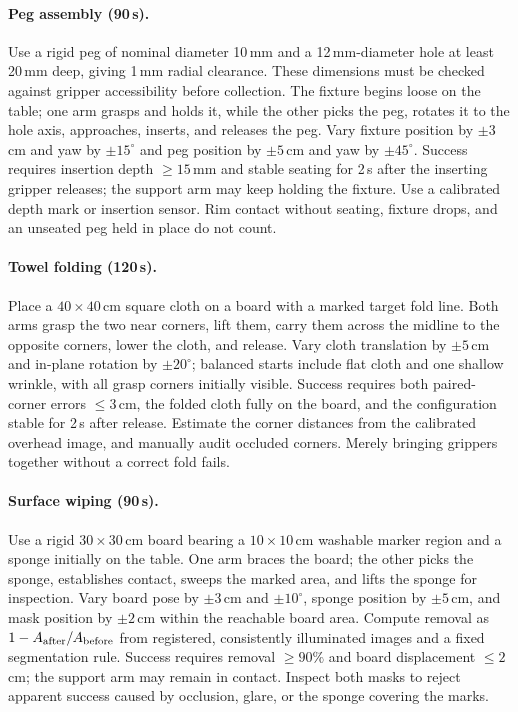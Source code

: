 \paragraph{Peg assembly (90\,s).}
Use a rigid peg of nominal diameter 10\,mm and a 12\,mm-diameter hole at least 20\,mm deep, giving 1\,mm radial clearance. These dimensions must be checked against gripper accessibility before collection. The fixture begins loose on the table; one arm grasps and holds it, while the other picks the peg, rotates it to the hole axis, approaches, inserts, and releases the peg. Vary fixture position by $\pm3$\,cm and yaw by $\pm15^\circ$ and peg position by $\pm5$\,cm and yaw by $\pm45^\circ$. Success requires insertion depth $\geq15$\,mm and stable seating for 2\,s after the inserting gripper releases; the support arm may keep holding the fixture. Use a calibrated depth mark or insertion sensor. Rim contact without seating, fixture drops, and an unseated peg held in place do not count.

\paragraph{Towel folding (120\,s).}
Place a $40\times40$\,cm square cloth on a board with a marked target fold line. Both arms grasp the two near corners, lift them, carry them across the midline to the opposite corners, lower the cloth, and release. Vary cloth translation by $\pm5$\,cm and in-plane rotation by $\pm20^\circ$; balanced starts include flat cloth and one shallow wrinkle, with all grasp corners initially visible. Success requires both paired-corner errors $\leq3$\,cm, the folded cloth fully on the board, and the configuration stable for 2\,s after release. Estimate the corner distances from the calibrated overhead image, and manually audit occluded corners. Merely bringing grippers together without a correct fold fails.

\paragraph{Surface wiping (90\,s).}
Use a rigid $30\times30$\,cm board bearing a $10\times10$\,cm washable marker region and a sponge initially on the table. One arm braces the board; the other picks the sponge, establishes contact, sweeps the marked area, and lifts the sponge for inspection. Vary board pose by $\pm3$\,cm and $\pm10^\circ$, sponge position by $\pm5$\,cm, and mask position by $\pm2$\,cm within the reachable board area. Compute removal as $1-A_{\rm after}/A_{\rm before}$ from registered, consistently illuminated images and a fixed segmentation rule. Success requires removal $\geq90\%$ and board displacement $\leq2$\,cm; the support arm may remain in contact. Inspect both masks to reject apparent success caused by occlusion, glare, or the sponge covering the marks.

